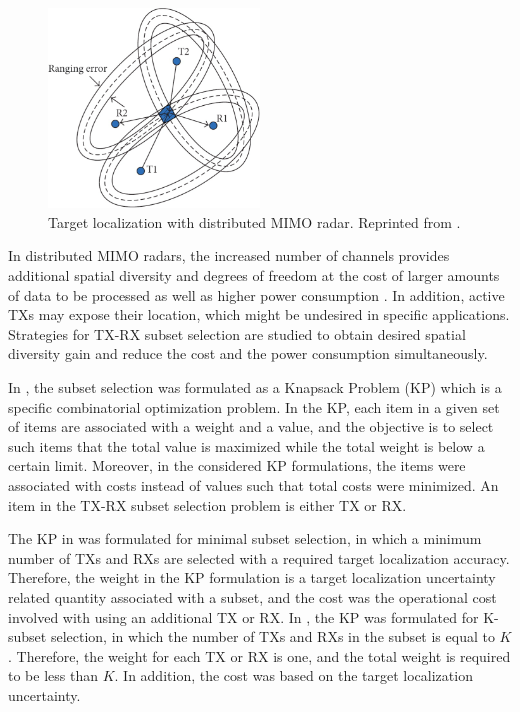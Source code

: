 \documentclass[english, 12pt, a4paper, elec, utf8, a-1b, online]{aaltothesis}
\begin{document}
\begin{figure}[b]
    \centering
    \includegraphics[width=0.5\textwidth]{figures/background/MIMO_TX_RX_selection.png}
    \caption{Target localization with distributed MIMO radar. Reprinted from \cite{Sun2014}.}
    \label{fig:dist_MIMO_localization}
\end{figure}


In distributed MIMO radars, the increased number of channels provides additional spatial diversity and degrees of freedom at the cost of larger amounts of data to be processed as well as higher power consumption \cite{Haimovich2008}.
In addition, active TXs may expose their location, which might be undesired in specific applications.
Strategies for TX-RX subset selection are studied to obtain desired spatial diversity gain and reduce the cost and the power consumption simultaneously.

In \cite{Godrich2011a, Godrich2011}, the subset selection was formulated as a Knapsack
Problem (KP) which is a specific combinatorial optimization problem.
In the KP, each item in a given set of items are associated with a weight and a value, and the objective is to select such items that the total value is maximized while the total weight is below a certain limit.
Moreover, in the considered KP formulations, the items were associated with costs instead of values such that total costs were minimized.
An item in the TX-RX subset selection problem is either TX or RX.

The KP in \cite{Godrich2011a} was formulated for minimal subset selection, in which a minimum number of TXs and RXs are selected with a required target localization accuracy.
Therefore, the weight in the KP formulation is a target localization uncertainty related quantity associated with a subset, and the cost was the operational cost involved with using an additional TX or RX.
In \cite{Godrich2011}, the KP was formulated for K-subset selection, in which the number of TXs and RXs in the subset is equal to $K$.
Therefore, the weight for each TX or RX is one, and the total weight is required to be less than $K$.
In addition, the cost was based on the target localization uncertainty.
\end{document}
